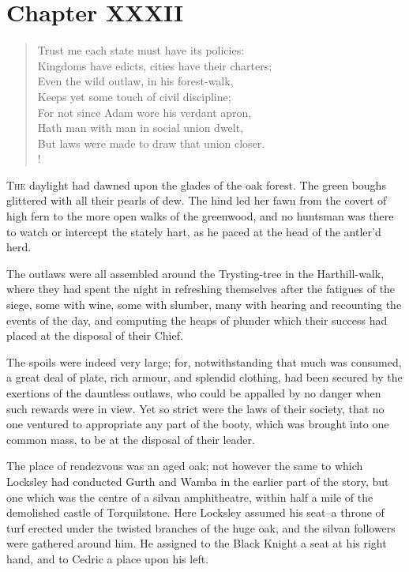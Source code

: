 \chapter{Chapter XXXII}

\begin{verse}
Trust me each state must have its policies:\\
Kingdoms have edicts, cities have their charters;\\
Even the wild outlaw, in his forest-walk,\\
Keeps yet some touch of civil discipline;\\
For not since Adam wore his verdant apron,\\
Hath man with man in social union dwelt,\\
But laws were made to draw that union closer.\\!
\end{verse}

\lettrine{T}{he} daylight had dawned upon the glades of the oak forest.
The green
boughs glittered with all their pearls of dew. The hind led her fawn
from the covert of high fern to the more open walks of the greenwood,
and no huntsman was there to watch or intercept the stately hart, as he
paced at the head of the antler'd herd.

The outlaws were all assembled around the Trysting-tree in the
Harthill-walk, where they had spent the night in refreshing themselves
after the fatigues of the siege, some with wine, some with slumber, many
with hearing and recounting the events of the day, and computing the
heaps of plunder which their success had placed at the disposal of their
Chief.

The spoils were indeed very large; for, notwithstanding that much was
consumed, a great deal of plate, rich armour, and splendid clothing, had
been secured by the exertions of the dauntless outlaws, who could be
appalled by no danger when such rewards were in view. Yet so strict were
the laws of their society, that no one ventured to appropriate any part
of the booty, which was brought into one common mass, to be at the
disposal of their leader.

The place of rendezvous was an aged oak; not however the same to which
Locksley had conducted Gurth and Wamba in the earlier part of the story,
but one which was the centre of a silvan amphitheatre, within half a
mile of the demolished castle of Torquilstone. Here Locksley assumed his
seat--a throne of turf erected under the twisted branches of the huge
oak, and the silvan followers were gathered around him. He assigned to
the Black Knight a seat at his right hand, and to Cedric a place upon
his left.

